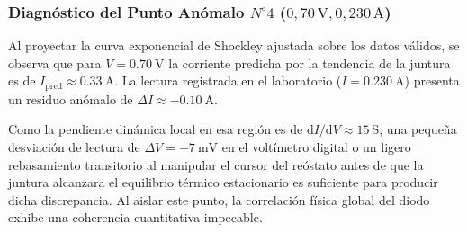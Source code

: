 \subsubsection{Diagnóstico del Punto Anómalo \texorpdfstring{$N^\circ 4$}{N. 4} (\texorpdfstring{$0{,}70\,\unit{\volt}, 0{,}230\,\unit{\ampere}$}{0,70 V, 0,230 A})}
Al proyectar la curva exponencial de Shockley ajustada sobre los datos válidos, se observa que para $V = \qty{0,70}{\volt}$ la corriente predicha por la tendencia de la juntura es de $I_{\text{pred}} \approx \qty{0,33}{\ampere}$. La lectura registrada en el laboratorio ($I = \qty{0,230}{\ampere}$) presenta un residuo anómalo de $\Delta I \approx -\qty{0,10}{\ampere}$. 

Como la pendiente dinámica local en esa región es de $\mathrm{d}I/\mathrm{d}V \approx \qty{15}{\siemens}$, una pequeña desviación de lectura de $\Delta V = -\qty{7}{\milli\volt}$ en el voltímetro digital o un ligero rebasamiento transitorio al manipular el cursor del reóstato antes de que la juntura alcanzara el equilibrio térmico estacionario es suficiente para producir dicha discrepancia. Al aislar este punto, la correlación física global del diodo exhibe una coherencia cuantitativa impecable.

